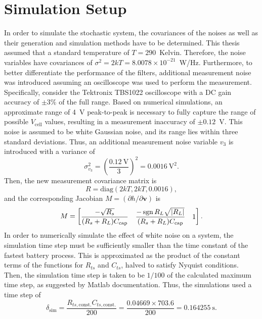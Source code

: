 \documentclass[../zhang_thesis.tex]{subfiles}
\begin{document}
\section{Simulation Setup}

In order to simulate the stochastic system, the covariances of the noises as well as their generation and simulation methods have to be determined. This thesis assumed that a standard temperature of $T=290$~Kelvin. Therefore, the noise variables have covariances of $\sigma^2=2kT=8.0078\times 10^{-21}$~W/Hz. Furthermore, to better differentiate the performance of the filters, additional measurement noise was introduced assuming an oscilloscope was used to perform the measurement.
Specifically, consider the Tektronix TBS1022 oscilloscope with a DC gain accuracy of $\pm 3\%$ of the full range. Based on numerical simulations, an approximate range of 4~V peak-to-peak is necessary to fully capture the range of possible $V_\text{cell}$ values, resulting in a measurement inaccuracy of $\pm 0.12$~V. This noise is assumed to be white Gaussian noise, and its range lies within three standard deviations. Thus, an additional measurement noise variable $v_3$ is introduced with
a variance of
\begin{equation}
    \sigma_{v_3}^2 = \left( \frac{0.12~\text{V}}{3} \right)^2 = 0.0016~\text{V}^2.
\end{equation}
Then, the new measurement covariance matrix is
\begin{equation}
    R = \mathrm{diag}(2kT,2kT,0.0016),
\end{equation}
and the corresponding Jacobian $M=(\partial h/\partial\mathbf{v})$ is
\begin{equation}
    M = \begin{bmatrix}
         \dfrac{-\sqrt{R_s}}{(R_s+R_L)C_\text{cap}} & \dfrac{-\operatorname{sgn}{R_L}\sqrt{|R_L|}}{(R_s+R_L)C_\text{cap}} & 1
        \end{bmatrix} .
\end{equation}
In order to numerically simulate the effect of white noise on a system, the simulation time step must be sufficiently smaller than the time constant of the fastest battery process. This is approximated as the product of the constant terms of the functions for $R_{ts}$ and $C_{ts}$, halved to satisfy Nyquist conditions. Then, the simulation time step is taken to be $1/100$ of the calculated maximum time step, as suggested by Matlab documentation. Thus, the simulations used a time step of
\begin{equation}
    \delta_\text{sim} = \frac{R_{ts,\text{const.}}C_{ts,\text{const.}}}{200} = \frac{0.04669\times 703.6}{200} = 0.164255~\text{s}.
\end{equation}
\end{document}
